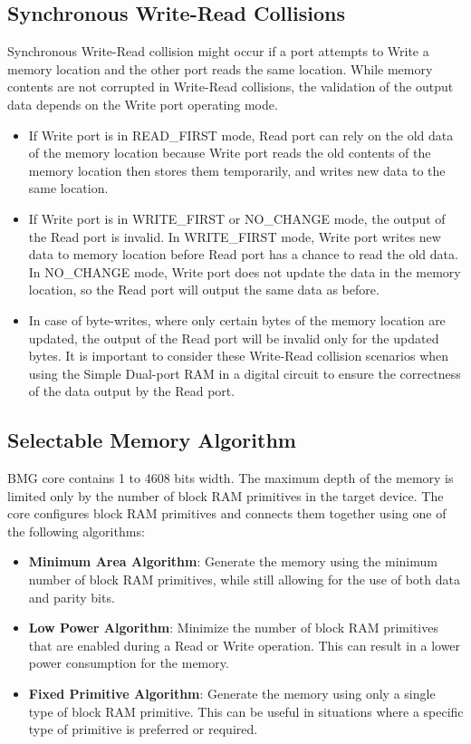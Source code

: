 \documentclass[a4paper, 12pt]{report}
\begin{document}
\subsection{Synchronous Write-Read Collisions}
Synchronous Write-Read collision might occur if a port attempts to Write a memory location and the other port reads the same location. While memory contents are not corrupted in Write-Read collisions, the validation of the output data depends on the Write port operating mode.
\begin{itemize}
    \item If Write port is in READ\_FIRST mode, Read port can rely on the old data of the memory location because Write port reads the old contents of the memory location then stores them temporarily, and writes new data to the same location.
    \item If Write port is in WRITE\_FIRST or NO\_CHANGE mode, the output of the Read port is invalid. In WRITE\_FIRST mode, Write port writes new data to memory location before Read port has a chance to read the old data. In NO\_CHANGE mode, Write port does not update the data in the memory location, so the Read port will output the same data as before.
    \item In case of byte-writes, where only certain bytes of the memory location are updated, the output of the Read port will be invalid only for the updated bytes. It is important to consider these Write-Read collision scenarios when using the Simple Dual-port RAM in a digital circuit to ensure the correctness of the data output by the Read port.
\end{itemize}
\subsection{Selectable Memory Algorithm}
BMG core contains 1 to 4608 bits width. The maximum depth of the memory is limited only by the number of block RAM primitives in the target device. The core configures block RAM primitives and connects them together using one of the following algorithms:
\begin{itemize}
    \item \textbf{Minimum Area Algorithm}: Generate the memory using the minimum number of block RAM primitives, while still allowing for the use of both data and parity bits. 
    \item \textbf{Low Power Algorithm}: Minimize the number of block RAM primitives that are enabled during a Read or Write operation. This can result in a lower power consumption for the memory.
    \item \textbf{Fixed Primitive Algorithm}: Generate the memory using only a single type of block RAM primitive. This can be useful in situations where a specific type of primitive is preferred or required. 
\end{itemize}
\end{document}
